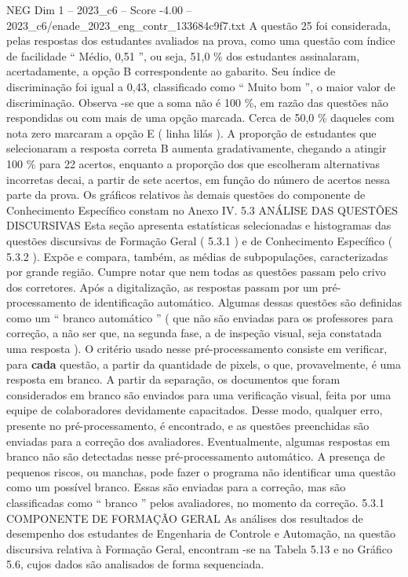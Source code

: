 \begin{textsample}{NEG Dim 1 – 2023\_c6 – Score -4.00 – 2023\_c6/enade\_2023\_eng\_contr\_133684c9f7.txt}
A questão 25 foi considerada, pelas respostas dos estudantes avaliados na prova, como uma questão com índice de facilidade “ Médio, 0,51 ”, ou seja, 51,0 \% dos estudantes assinalaram, acertadamente, a opção B correspondente ao gabarito.
Seu índice de discriminação foi igual a 0,43, classificado como “ Muito bom ”, o maior valor de discriminação.
Observa -se que a soma não é 100 \%, em razão das questões não respondidas ou com mais de uma opção marcada.
Cerca de 50,0 \% daqueles com nota zero marcaram a opção E ( linha lilás ).
A proporção de estudantes que selecionaram a resposta correta B aumenta gradativamente, chegando a atingir 100 \% para 22 acertos, enquanto a proporção dos que escolheram alternativas incorretas decai, a partir de sete acertos, em função do número de acertos nessa parte da prova.
Os gráficos relativos às demais questões do componente de Conhecimento Específico constam no Anexo IV. 5.3 ANÁLISE DAS QUESTÕES DISCURSIVAS Esta seção apresenta estatísticas selecionadas e histogramas das questões discursivas de Formação Geral ( 5.3.1 ) e de Conhecimento Específico ( 5.3.2 ).
Expõe e compara, também, as médias de subpopulações, caracterizadas por grande região.
Cumpre notar que nem todas as questões passam pelo crivo dos corretores.
Após a digitalização, as respostas passam por um pré-processamento de identificação automático.
Algumas dessas questões são definidas como um “ branco automático ” ( que não são enviadas para os professores para correção, a não ser que, na segunda fase, a de inspeção visual, seja constatada uma resposta ).
O critério usado nesse pré-processamento consiste em verificar, para \textbf{cada} questão, a partir da quantidade de pixels, o que, provavelmente, é uma resposta em branco.
A partir da separação, os documentos que foram considerados em branco são enviados para uma verificação visual, feita por uma equipe de colaboradores devidamente capacitados.
Desse modo, qualquer erro, presente no pré-processamento, é encontrado, e as questões preenchidas são enviadas para a correção dos avaliadores.
Eventualmente, algumas respostas em branco não são detectadas nesse pré-processamento automático.
A presença de pequenos riscos, ou manchas, pode fazer o programa não identificar uma questão como um possível branco.
Essas são enviadas para a correção, mas são classificadas como “ branco ” pelos avaliadores, no momento da correção. 5.3.1 COMPONENTE DE FORMAÇÃO GERAL As análises dos resultados de desempenho dos estudantes de Engenharia de Controle e Automação, na questão discursiva relativa à Formação Geral, encontram -se na Tabela 5.13 e no Gráfico 5.6, cujos dados são analisados de forma sequenciada.

\end{textsample}

